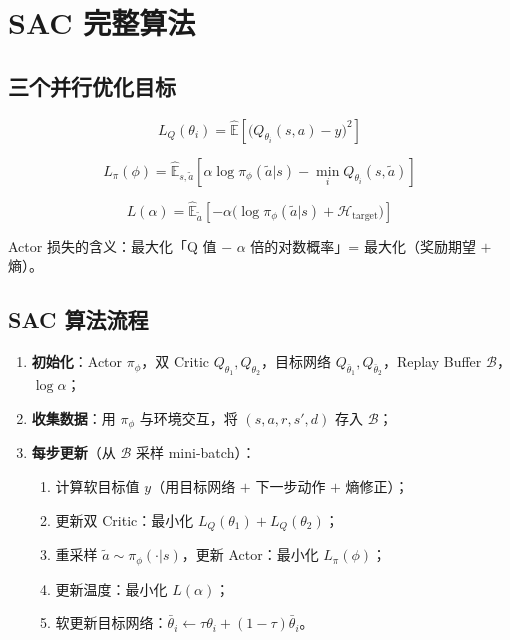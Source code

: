 \documentclass{article}
\begin{document}
\section*{SAC 完整算法}

\subsection*{三个并行优化目标}

\[
\boxed{L_Q(\theta_i)  = \hat{\mathbb{E}}\!\left[\bigl(Q_{\theta_i}(s,a)-y\bigr)^2\right]}
\]

\[
\boxed{L_\pi(\phi)    = \hat{\mathbb{E}}_{s,\tilde a}\!\left[\alpha\log\pi_\phi(\tilde a|s) - \min_{i}Q_{\theta_i}(s,\tilde a)\right]}
\]

\[
\boxed{L(\alpha)      = \hat{\mathbb{E}}_{\tilde a}\!\left[-\alpha\bigl(\log\pi_\phi(\tilde a|s)+\mathcal{H}_\text{target}\bigr)\right]}
\]

Actor 损失的含义：最大化「Q 值 $-$ $\alpha$ 倍的对数概率」= 最大化（奖励期望 $+$ 熵）。

\subsection*{SAC 算法流程}

\begin{enumerate}
  \item \textbf{初始化}：Actor $\pi_\phi$，双 Critic $Q_{\theta_1}, Q_{\theta_2}$，目标网络 $Q_{\bar\theta_1}, Q_{\bar\theta_2}$，Replay Buffer $\mathcal{B}$，$\log\alpha$；
  \item \textbf{收集数据}：用 $\pi_\phi$ 与环境交互，将 $(s,a,r,s',d)$ 存入 $\mathcal{B}$；
  \item \textbf{每步更新}（从 $\mathcal{B}$ 采样 mini-batch）：
    \begin{enumerate}
      \item 计算软目标值 $y$（用目标网络 $+$ 下一步动作 $+$ 熵修正）；
      \item 更新双 Critic：最小化 $L_Q(\theta_1) + L_Q(\theta_2)$；
      \item 重采样 $\tilde a\sim\pi_\phi(\cdot|s)$，更新 Actor：最小化 $L_\pi(\phi)$；
      \item 更新温度：最小化 $L(\alpha)$；
      \item 软更新目标网络：$\bar\theta_i \leftarrow \tau\theta_i+(1-\tau)\bar\theta_i$。
    \end{enumerate}
\end{enumerate}
\end{document}
